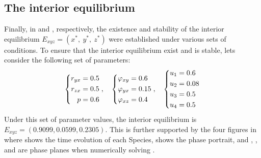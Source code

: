 \subsection{The interior equilibrium}\label{subsec:numsim_interior_equilibrium}
Finally, in  and , respectively, the existence and stability
of the interior equilibrium $E_{xyz}=\left(x^*,\ y^*,\ z^*\right)$ were established under various sets of conditions.
To ensure that the interior equilibrium exist and is stable, lets consider the following set of parameters:
\begin{equation}\label{params:interior-a}
    \begin{dcases}
        \begin{aligned}
            r_{yx} &= 0.5\\
            r_{zx} &= 0.5\\
            p &= 0.6
        \end{aligned}
    \end{dcases},\quad 
    \begin{dcases}
        \begin{aligned}
            \varphi_{xy} &= 0.6\\
            \varphi_{yx} &= 0.15\\
            \varphi_{xz} &= 0.4
        \end{aligned}
    \end{dcases},\quad
    \begin{dcases}
        \begin{aligned}
            u_1 &= 0.6\\
            u_2 &= 0.08\\
            u_3 &= 0.5\\
            u_4 &= 0.5
        \end{aligned}
    \end{dcases}
\end{equation}
Under this set of parameter values, the interior equilibrium is $E_{xyz}=(0.9099,0.0599,0.2305)$.
This is further supported by the four figures in  where  shows the time evolution of each Species,  shows the phase portrait, and , , and  are phase planes when numerically solving .

